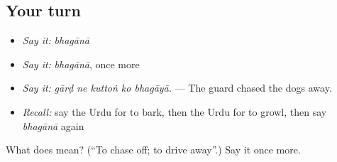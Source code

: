 \subsection*{Your turn}
\begin{itemize}
\raggedright
  \item \emph{Say it:} \emph{bhagānā}
  \item \emph{Say it:} \emph{bhagānā}, once more
  \item \emph{Say it:} \emph{gārḍ ne kuttoṅ ko bhagāyā.} — The guard chased the dogs away.
  \item \emph{Recall:} say the Urdu for to bark, then the Urdu for to growl, then say \emph{bhagānā} again
\end{itemize}

\begin{tcolorbox}[breakable,colback=teal!4,colframe=teal!35!black,title={Before you move on}]
What does  mean? (\textquotedblleft{}To chase off; to drive away\textquotedblright{}.) Say it once more.
\end{tcolorbox}
